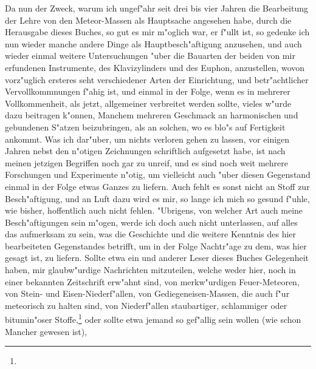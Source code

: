 \documentclass[a4paper, 11pt, oneside, polutonikogreek, german]{article}
\begin{document}
Da nun der Zweck, warum ich ungef"ahr seit drei bis vier Jahren die Bearbeitung der Lehre von den Meteor-Massen als Hauptsache angesehen habe, durch die Herausgabe dieses Buches, so gut es mir m"oglich war, er f"ullt ist, so gedenke ich nun wieder manche andere Dinge als Hauptbesch"aftigung anzusehen, und auch wieder einmal weitere Untersuchungen "uber die Bauarten der beiden von mir erfundenen Instrumente, des Klavizylinders und des Euphon, anzustellen, wovon vorz"uglich ersteres seht verschiedener Arten der Einrichtung, und betr"achtlicher Vervollkommnungen f"ahig ist, und einmal in der Folge, wenn es in mehrerer Vollkommenheit, als jetzt, allgemeiner verbreitet werden sollte, vieles w"urde dazu beitragen k"onnen, Manchem mehreren Geschmack an harmonischen und gebundenen S"atzen beizubringen, als an solchen, wo es blo"s auf Fertigkeit ankommt. Was ich dar"uber, um nichts verloren gehen zu lassen, vor einigen Jahren nebst den n"otigen Zeichnungen schriftlich aufgesetzt habe, ist nach meinen jetzigen Begriffen noch gar zu unreif, und es sind noch weit mehrere Forschungen und Experimente n"otig, um vielleicht auch "uber diesen Gegenstand einmal in der Folge etwas Ganzes zu liefern. Auch fehlt es sonst nicht an Stoff zur Besch"aftigung, und an Luft dazu wird es mir, so lange ich mich so gesund f"uhle, wie bisher, hoffentlich auch nicht fehlen. "Ubrigens, von welcher Art auch meine Besch"aftigungen sein m"ogen, werde ich doch auch nicht unterlassen, auf alles das aufmerksam zu sein, was die Geschichte und die weitere Kenntnis des hier bearbeiteten Gegenstandes betrifft, um in der Folge Nachtr"age zu dem, was hier gesagt ist, zu liefern. Sollte etwa ein und anderer Leser dieses Buches Gelegenheit haben, mir glaubw"urdige Nachrichten mitzuteilen, welche weder hier, noch in einer bekannten Zeitschrift erw"ahnt sind, von merkw"urdigen Feuer-Meteoren, von Stein- und Eisen-Niederf"allen, von Gediegeneisen-Massen, die auch f"ur meteorisch zu halten sind, von Niederf"allen staubartiger, schlammiger oder bitumin"oser Stoffe,\footnote{} oder sollte etwa jemand so gef"allig sein wollen (wie schon Mancher gewesen ist), 
\end{document}
